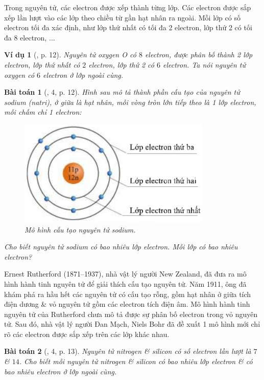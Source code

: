 \documentclass{article}
\newtheorem{baitoan}{Bài toán}
\newtheorem{vidu}{Ví dụ}
\begin{document}
Trong nguyên tử, các electron được xếp thành từng lớp. Các electron được sắp xếp lần lượt vào các lớp theo chiều từ gần hạt nhân ra ngoài. Mỗi lớp có số electron tối đa xác định, như lớp thứ nhất có tối đa 2 electron, lớp thứ 2 có tối đa 8 electron, $\ldots$

\begin{vidu}[\cite{SGK_KHTN_7_Canh_Dieu}, p. 12]
	Nguyên tử oxygen \emph{O} có $8$ electron, được phân bố thành 2 lớp electron, lớp thứ nhất có $2$ electron, lớp thứ 2 có $6$ electron. Ta nói nguyên tử oxygen có $6$ electron ở lớp ngoài cùng.
\end{vidu}

\begin{baitoan}[\cite{SGK_KHTN_7_Canh_Dieu}, 4, p. 12]
	Hình sau mô tả thành phần cấu tạo của nguyên tử sodium (natri), ở giữa là hạt nhân, mỗi vòng tròn lớn tiếp theo là 1 lớp electron, mỗi chấm chỉ 1 electron:
	\begin{figure}[H]
		\centering
		\includegraphics[scale=0.4]{sodium}
		\caption{Mô hình cấu tạo nguyên tử sodium.}
	\end{figure}
	\noindent Cho biết nguyên tử sodium có bao nhiêu lớp electron. Mỗi lớp có bao nhiêu electron?
\end{baitoan}
Ernest Rutherford (1871--1937), nhà vật lý người New Zealand, đã đưa ra mô hình hành tinh nguyên tử để giải thích cấu tạo nguyên tử. Năm 1911, ông đã khám phá ra hầu hết các nguyên tử có cấu tạo rỗng, gồm hạt nhân ở giữa tích điện dương \& vỏ nguyên tử gồm các electron tích điện âm. Mô hình hành tinh nguyên tử của Rutherford chưa mô tả được sự phân bố electron trong vỏ nguyên tử. Sau đó, nhà vật lý người Đan Mạch, Niels Bohr đã đề xuất 1 mô hình mới chỉ rõ các electron được sắp xếp trên các lớp khác nhau.

\begin{baitoan}[\cite{SGK_KHTN_7_Canh_Dieu}, 4, p. 13]
	Nguyên tử nitrogen \& silicon có số electron lần lượt là $7$ \& $14$. Cho biết mỗi nguyên tử nitrogen \& silicon có bao nhiêu lớp electron \& có bao nhiêu electron ở lớp ngoài cùng.
\end{baitoan}
\end{document}
